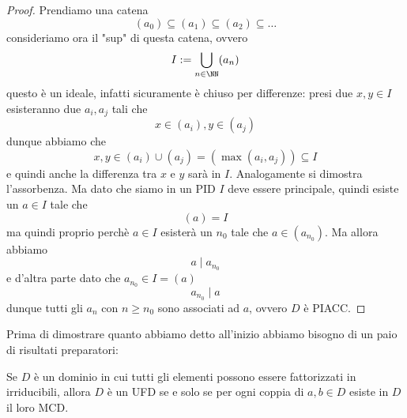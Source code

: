 \documentclass[11pt]{scrartcl}
\begin{document}
	\begin{proof}
		Prendiamo una catena
		$$(a_0)\subseteq (a_1)\subseteq (a_2)\subseteq \dots $$
		consideriamo ora il "sup" di questa catena, ovvero
		$$I:=\bigcup_{n\in\NN}(a_n)$$
		questo è un ideale, infatti sicuramente è chiuso per differenze: presi due $x,y\in I$ esisteranno due $a_i,a_j$ tali che
		$$x\in (a_i),y\in (a_j)$$
		dunque abbiamo che 
		$$x,y\in(a_i)\cup (a_j)= \left(\max(a_i,a_j)\right)\subseteq I$$
		e quindi anche la differenza tra $x$ e $y$ sarà in $I$. Analogamente si dimostra l'assorbenza. Ma dato che siamo in un PID $I$ deve essere principale, quindi esiste un $a\in I$ tale che 
		$$(a)=I$$
		ma quindi proprio perchè $a\in I$ esisterà un $n_0$ tale che $a\in (a_{n_0})$. Ma allora abbiamo
		$$a\mid a_{n_0}$$
		e d'altra parte dato che $a_{n_0}\in I=(a)$ 
		$$a_{n_0} \mid a$$
		dunque tutti gli $a_n$ con $n\ge n_0$ sono associati ad $a$, ovvero $D$ è PIACC.
	\end{proof}
	Prima di dimostrare quanto abbiamo detto all'inizio abbiamo bisogno di un paio di risultati preparatori:
	\begin{lemma}
		Se $D$ è un dominio in cui tutti gli elementi possono essere fattorizzati in irriducibili, allora $D$ è un UFD se e solo se per ogni coppia di $a,b\in D$ esiste in $D$ il loro MCD.
	\end{lemma}
\end{document}
